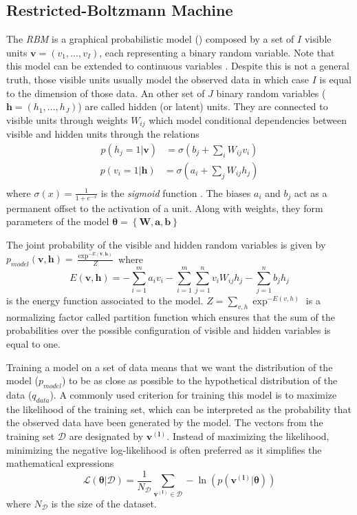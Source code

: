 \documentclass[letterpaper]{article}
\begin{document}
\subsection{Restricted-Boltzmann Machine}
The \textit{RBM} \cite{hinton2006fast} is a graphical probabilistic model () composed by a set of $I$ visible units $\bm{v} = (v_{1},...,v_{I})$, each representing a binary random variable. Note that this model can be extended to continuous variables \cite{hinton2010practical}. Despite this is not a general truth, those visible units usually model the observed data in which case $I$ is equal to the dimension of those data. An other set of $J$ binary random variables ($\bm{h} = (h_{1},...,h_{J})$) are called hidden (or latent) units. They are connected to visible units through weights $W_{ij}$ which model conditional dependencies between visible and hidden units through the relations
\begin{align}
\label{eq:marginal_RBM_1}
p(h_{j}=1|\bm{v}) &= \sigma \left( b_{j} + \sum_{i}W_{ij}v_{i} \right)
\end{align}
\begin{align}
\label{eq:marginal_RBM_2}
p(v_{i}=1|\bm{h}) &= \sigma \left( a_{i} + \sum_{j}W_{ij}h_{j} \right)\\
\end{align}
where $\sigma	(x) = \frac{1}{1+e^{-x}}$ is the \textit{sigmoid} function . The biases $a_{i}$ and $b_{j}$ act as a permanent offset to the activation of a unit. Along with weights, they form parameters of the model $\bm{\theta} = \left\lbrace \bm{W} , \bm{a} , \bm{b} \right\rbrace$

The joint probability of the visible and hidden random variables is given by $p_{model}(\bm{v},\bm{h}) = \frac{\exp^{-E(\bm{v},\bm{h})}}{Z}$ where
\begin{equation}
\label{eq:energy}
E(\bm{v},\bm{h}) = - \sum_{i=1}^{m} a_{i} v_{i}  - \sum_{i=1}^{m} \sum_{j=1}^{n} v_{i} W_{ij} h_{j} - \sum_{j = 1}^{n} b_{j} h_{j}
\end{equation}
is the energy function associated to the model. $Z = \sum_{v,h}\exp^{-E(v,h)}$ is a normalizing factor called partition function which ensures that the sum of the probabilities over the possible configuration of visible and hidden variables is equal to one.

Training a model on a set of data means that we want the distribution of the model ($p_{model}$) to be as close as possible to the hypothetical distribution of the data ($q_{data}$).
A commonly used criterion for training this model is to maximize the likelihood of the training set, which can be interpreted as the probability that the observed data have been generated by the model.
The vectors from the training set $\mathcal{D}$ are designated by $\bm{v^{(l)}}$.
Instead of maximizing the likelihood, minimizing the negative log-likelihood is often preferred as it simplifies the mathematical expressions
\begin{equation}
\label{eq:likelihood}
\mathcal{L(\bm{\theta}|\mathcal{D})}  = \frac{1}{N_{\mathcal{D}}} \sum_{\bm{v^{(l)}} \in \mathcal{D}} - \ln \left( p(\bm{v^{(l)}}|\bm{\theta})\right)
\end{equation}
where $N_{\mathcal{D}}$ is the size of the dataset. 
\end{document}
